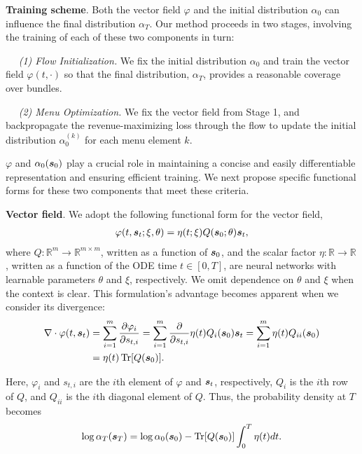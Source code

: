 \textbf{Training scheme}. Both the vector field $\varphi$ and the initial distribution $\alpha_0$ can influence the final distribution $\alpha_T$. 
Our method proceeds in two stages, involving the training of  each of
these two components in turn: 

$\quad$ \emph{(1) Flow Initialization.} We  fix  the initial distribution $\alpha_0$ and train the vector field $\varphi(t, \cdot)$ so that the final distribution, $\alpha_T$,
provides a reasonable coverage over bundles. 

$\quad$ \emph{(2) Menu Optimization.} We  fix the vector field from Stage 1, and backpropagate the revenue-maximizing loss through the flow to update the initial distribution $\alpha_0^{(k)}$ 
for each menu element $k$.


$\varphi$ and $\alpha_0({\bm{s}}_0)$ play a crucial role in maintaining a concise and easily differentiable representation and ensuring efficient training. We next propose specific functional forms for these two components that meet these criteria.

\textbf{Vector field}. We adopt the following functional form for the vector field,
%
\begin{align}
    \varphi(t, {\bm{s}}_t;\xi,\theta) = \eta(t;\xi) Q({\bm{s}}_0;\theta) {\bm{s}}_t,\label{equ:varphi}
\end{align}
where $Q: \mathbb{R}^{m}\rightarrow\mathbb{R}^{m\times m}$, written as a function of ${\bm{s}}_0$, and the scalar factor $\eta:\mathbb{R}\rightarrow \mathbb{R}$, written as a function of  the ODE time $t\in[0,T]$, are neural networks with learnable parameters $\theta$ and $\xi$, respectively. 
%
%
We  omit dependence on $\theta$ and $\xi$ when the context is clear. This formulation's advantage becomes apparent when we consider its divergence:
%
\begin{align}
    \nabla\cdot \varphi(t,{\bm{s}}_t) &= \sum_{i=1}^m \frac{\partial \varphi_i}{\partial s_{t,i}}
    = \sum_{i=1}^m \frac{\partial}{\partial s_{t,i}} \eta(t) Q_i({\bm{s}}_0) {\bm{s}}_t = \sum_{i=1}^m  \eta(t) Q_{ii}({\bm{s}}_0) \\
    & = \eta(t)\operatorname{Tr}[Q({\bm{s}}_0)].
\end{align}

Here, $\varphi_i$ and $s_{t,i}$ are the $i$th element of $\varphi$ and ${\bm{s}}_t$, respectively, $Q_i$ is the $i$th row of $Q$, and $Q_{ii}$ is the $i$th diagonal element of $Q$. Thus, the probability density at $T$ becomes
\begin{align}
    \log \alpha_T({\bm{s}}_T) = \log \alpha_0({\bm{s}}_0) - \operatorname{Tr}[Q({\bm{s}}_0)]\int_0^T \eta(t) dt.\label{equ:likelihood}
\end{align}

